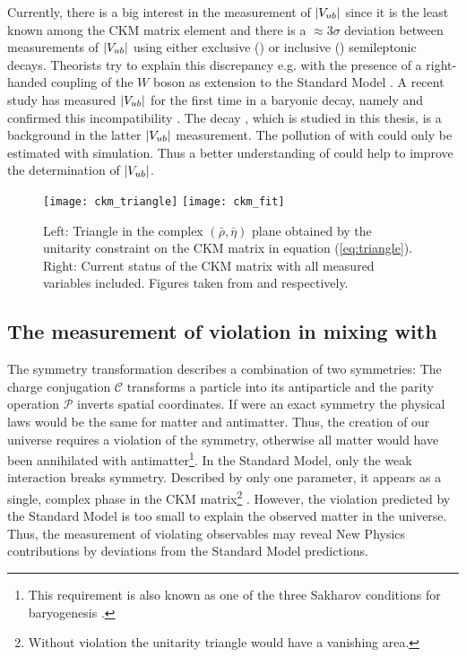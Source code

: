 Currently, there is a big interest in the measurement of $|{V_{{u}{b}}}|$ since it is the least known among the CKM matrix element and there is a $\approx 3\sigma$ deviation between measurements of $|{V_{{u}{b}}}|$ using either exclusive (\decay{\B}{\pi\ell\neul}) or inclusive () semileptonic decays.
Theorists try to explain this discrepancy e.g. with the presence of a right-handed coupling of the $W$ boson as extension to the Standard Model \cite{Vub_RightHanded}.
A recent \lhcb study has measured $|{V_{{u}{b}}}|$ for the first time in a baryonic decay, namely \decay{\Lb}{\proton\mun\neumb} and confirmed this incompatibility \cite{SL_Vub}.
The decay \LbToDpmunuX, which is studied in this thesis, is a background in the latter $|{V_{{u}{b}}}|$ measurement.
The pollution of \decay{\Lb}{\proton\mun\neumb} with \LbToDpmunuX could only be estimated with simulation.
Thus a better understanding of \LbToDpmunuX could help to improve the determination of $|{V_{{u}{b}}}|$.
\begin{figure}[ptb]
    \centering
	\texttt{[image: ckm\_triangle]}	
	\texttt{[image: ckm\_fit]}	
	\caption{Left: Triangle in the complex $(\bar{\rho}, \bar{\eta})$ plane obtained by the unitarity constraint on the CKM matrix in equation (\ref{eq:triangle}). Right: Current status of the CKM matrix with all measured variables included. Figures taken from \cite{PDG} and \cite{CKM_fitter}
    respectively.}
	\label{fig:CKM_triangle}
\end{figure}

\subsection{The measurement of \CP violation in mixing with \asld}
The symmetry transformation \CP describes a combination of two symmetries:
The charge conjugation $\mathcal{C}$ transforms a particle into its antiparticle and the parity operation $\mathcal{P}$ inverts spatial coordinates.
If \CP were an exact symmetry the physical laws would be the same for matter and antimatter.
Thus, the creation of our universe requires a violation of the \CP symmetry, otherwise all matter would have been annihilated with antimatter\footnote{This requirement is also known as one of the three Sakharov conditions for baryogenesis \cite{Sakharov}.}.
In the Standard Model, only the weak interaction breaks \CP symmetry.
Described by only one parameter, it appears as a single, complex phase in the CKM matrix\footnote{Without \CP violation the unitarity triangle would have a vanishing area.} \cite{Kobayashi_CKM}.
However, the \CP violation predicted by the Standard Model is too small to explain the observed matter in the universe.
Thus, the measurement of \CP violating observables may reveal New Physics contributions by deviations from the Standard Model predictions.

